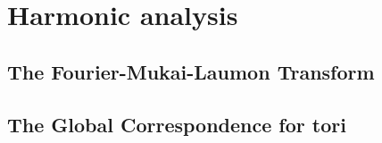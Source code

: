\chapter{Harmonic analysis}
    \begin{abstract}
        
    \end{abstract}
    
    \section{The Fourier-Mukai-Laumon Transform}
    
    \section{The Global Correspondence for tori}